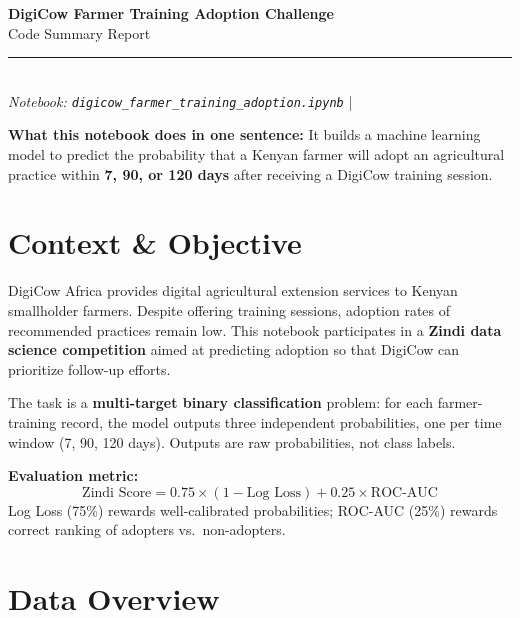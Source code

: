 \documentclass[11pt, a4paper]{article}
\begin{document}
\begin{center}
  {\LARGE\bfseries\color{navy} DigiCow Farmer Training Adoption Challenge}\\[0.4em]
  {\large\color{blue} Code Summary Report}\\[0.3em]
  {\color{gray}\rule{10cm}{0.8pt}}\\[0.3em]
  {\small\textit{Notebook: \texttt{digicow\_farmer\_training\_adoption.ipynb}} \quad|}
\end{center}

\vspace{0.4em}
\begin{tcolorbox}[infobox]
\textbf{What this notebook does in one sentence:} It builds a machine learning model to predict the probability that a Kenyan farmer will adopt an agricultural practice within \textbf{7, 90, or 120 days} after receiving a DigiCow training session.
\end{tcolorbox}

\section{Context \& Objective}

DigiCow Africa provides digital agricultural extension services to Kenyan smallholder farmers. Despite offering training sessions, adoption rates of recommended practices remain low. This notebook participates in a \textbf{Zindi data science competition} aimed at predicting adoption so that DigiCow can prioritize follow-up efforts.

The task is a \textbf{multi-target binary classification} problem: for each farmer-training record, the model outputs three independent probabilities, one per time window (7, 90, 120 days). Outputs are raw probabilities, not class labels.

\textbf{Evaluation metric:}
\[
\text{Zindi Score} = 0.75 \times (1 - \text{Log Loss}) + 0.25 \times \text{ROC-AUC}
\]
Log Loss (75\%) rewards well-calibrated probabilities; ROC-AUC (25\%) rewards correct ranking of adopters vs.\ non-adopters.

\section{Data Overview}
\end{document}
